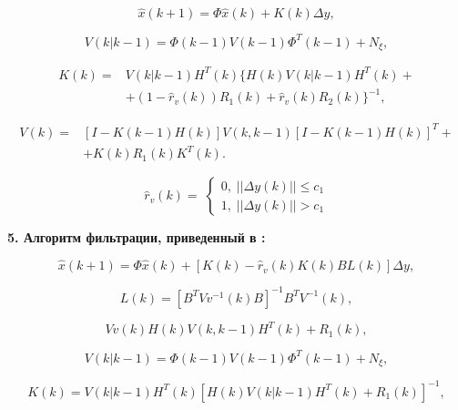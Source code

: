 \begin{equation}\label{eq3:optim4}
\hat{x}(k+1)=\Phi\hat{x}(k)+K(k)\Delta y,
\end{equation}

\begin{equation}\label{eq3:optim4_3}
V(k|k-1)=\Phi(k-1)V(k-1)\Phi^T(k-1)+N_\xi,
\end{equation}

\begin{equation}\label{eq3:optim4_4}
\begin{split}
K(k)=&V(k|k-1)H^T(k)\{H(k)V(k|k-1)H^T(k)+\\
&+(1-\hat{r}_v(k))R_1(k)+\hat{r}_v(k)R_2(k)\}^{-1},
\end{split}
\end{equation}

\begin{equation}\label{eq3:optim4_5}
\begin{split}
V(k)=&[I-K(k-1)H(k)]V(k,k-1)[I-K(k-1)H(k)]^T+\\
&+K(k)R_1(k)K^T(k).
\end{split}
\end{equation}

\begin{equation}
\hat{r}_v(k)= \;
\begin{cases}
0, \; ||\Delta y(k)||\leq c_1 \\    
1, \; ||\Delta y(k)||> c_1    
\end{cases}
\end{equation}

\textbf{5. Алгоритм фильтрации, приведенный в \cite{Klekis}:}

\begin{equation}\label{eq3:optim5}
\hat{x}(k+1)=\Phi\hat{x}(k)+[K(k)-\hat{r}_v(k)K(k)BL(k)]\Delta y,
\end{equation}

\begin{equation}\label{eq3:optim5_1}
L(k)=[B^TVv^{-1}(k)B]^{-1}B^TV^{-1}(k),
\end{equation}

\begin{equation}\label{eq3:optim5_2}
Vv(k)H(k)V(k,k-1)H^T(k)+R_1(k),
\end{equation}

\begin{equation}\label{eq3:optim5_3}
V(k|k-1)=\Phi(k-1)V(k-1)\Phi^T(k-1)+N_\xi,
\end{equation}

\begin{equation}\label{eq3:optim5_4}
K(k)=V(k|k-1)H^T(k)[H(k)V(k|k-1)H^T(k)+R_1(k)]^{-1},
\end{equation}

